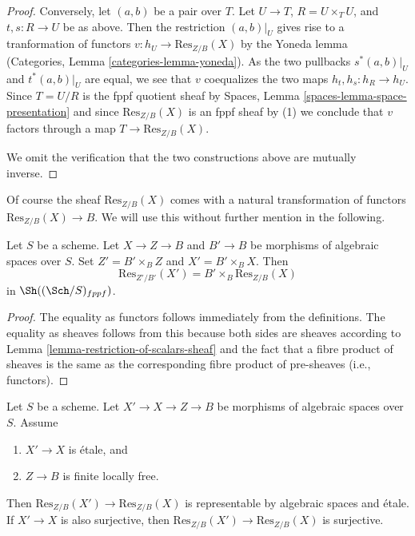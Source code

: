 \begin{proof}
\medskip\noindent
Conversely, let $(a, b)$ be a pair over $T$.
Let $U \to T$, $R = U \times_T U$, and $t, s : R \to U$ be as
above. Then the restriction $(a, b)|_U$ gives rise to a
tranformation of functors $v : h_U \to \text{Res}_{Z/B}(X)$ by the
Yoneda lemma
(Categories, Lemma \ref{categories-lemma-yoneda}).
As the two pullbacks $s^*(a, b)|_U$ and $t^*(a, b)|_U$
are equal, we see that $v$ coequalizes the two maps
$h_t, h_s : h_R \to h_U$. Since $T = U/R$ is the fppf quotient sheaf by
Spaces, Lemma \ref{spaces-lemma-space-presentation}
and since $\text{Res}_{Z/B}(X)$ is an fppf sheaf by (1) we conclude
that $v$ factors through a map $T \to \text{Res}_{Z/B}(X)$.

\medskip\noindent
We omit the verification that the two constructions above are mutually
inverse.
\end{proof}

\noindent
Of course the sheaf $\text{Res}_{Z/B}(X)$ comes with a natural transformation
of functors $\text{Res}_{Z/B}(X) \to B$. We will use this without further
mention in the following.

\begin{lemma}
\label{lemma-etale-base-change-restriction-of-scalars}
Let $S$ be a scheme. Let $X \to Z \to B$ and $B' \to B$
be morphisms of algebraic spaces over $S$.
Set $Z' = B' \times_B Z$ and $X' = B' \times_B X$. Then
$$
\text{Res}_{Z'/B'}(X')
=
B' \times_B \text{Res}_{Z/B}(X)
$$
in $\Sh((\Sch/S)_{fppf})$.
\end{lemma}

\begin{proof}
The equality as functors follows immediately from the definitions.
The equality as sheaves follows from this because both sides are
sheaves according to
Lemma \ref{lemma-restriction-of-scalars-sheaf}
and the fact that a fibre product of sheaves is the same as the
corresponding fibre product of pre-sheaves (i.e., functors).
\end{proof}

\begin{lemma}
\label{lemma-etale-covering-restriction-of-scalars}
Let $S$ be a scheme. Let $X' \to X \to Z \to B$ be morphisms of
algebraic spaces over $S$. Assume
\begin{enumerate}
\item $X' \to X$ is \'etale, and
\item $Z \to B$ is finite locally free.
\end{enumerate}
Then $\text{Res}_{Z/B}(X') \to \text{Res}_{Z/B}(X)$ is representable
by algebraic spaces and \'etale. If $X' \to X$ is also surjective,
then $\text{Res}_{Z/B}(X') \to \text{Res}_{Z/B}(X)$ is surjective.
\end{lemma}

